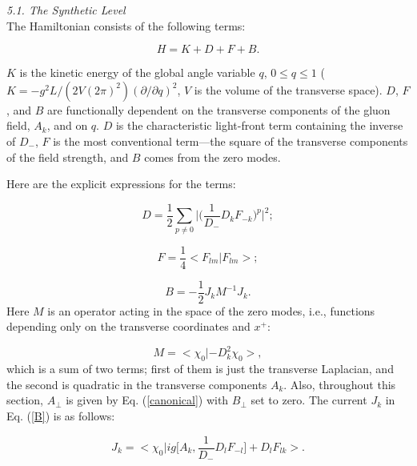 \documentclass[a4paper,12pt]{article}
\begin{document}
\vspace{.3cm}

{\it 5.1. The Synthetic Level }\\

\vspace{.3cm}
The Hamiltonian consists of the following terms:

\begin{equation}
\label{terms}
H = K + D + F + B.
\end{equation}

$K$ is the kinetic energy of the global angle variable $q$, 
$0 \leq q \leq 1$  \-
($K = -g^2L/(2V(2\pi)^2)(\partial/\partial q)^2$, 
$V$ is the volume of the transverse space).
$D$, $F$, and $B$ are functionally dependent on the transverse
components of the gluon field, $A_k$, and on $q$. $D$ is the 
characteristic light-front term containing the inverse of $D_-$, 
$F$ is the most conventional term---the square of the transverse 
components of the field strength, and $B$ comes from the zero modes. 

Here are the explicit expressions for the terms:

\begin{equation}
\label{D}
 D = \frac{1}{2} \sum_{p \neq 0} 
\bigg| \bigg( \frac{1}{D_-}D_kF_{-k} \bigg)^p\bigg|^2;
\end{equation}

\begin{equation}
\label{F}
F = \frac{1}{4} <F_{lm}|F_{lm}>;
\end{equation}

\begin{equation}
\label{B}
B = -\frac{1}{2} J_k M^{-1} J_k.
\end{equation}
Here $M$ is an operator acting in the space of the zero modes, i.e.,
functions depending only on the transverse coordinates and $x^+$:

\begin{equation}
\label{M}
M = <\chi_0|-D_k^2\chi_0>,
\end{equation}
which is a sum of two terms; 
first of them is just the transverse 
Laplacian, and the second is quadratic in the transverse components $A_k$.
Also, throughout this section, $A_\perp$ is given by
Eq. (\ref{canonical}) with $B_\perp$ set to zero.
The current $J_k$ in Eq. (\ref{B}) is as follows:

\begin{equation}
\label{J}
J_k = <\chi_0|ig \bigg[ A_k,\frac{1}{D_-} D_lF_{-l} \bigg] 
+ D_lF_{lk}>.
\end{equation} 
\end{document}
